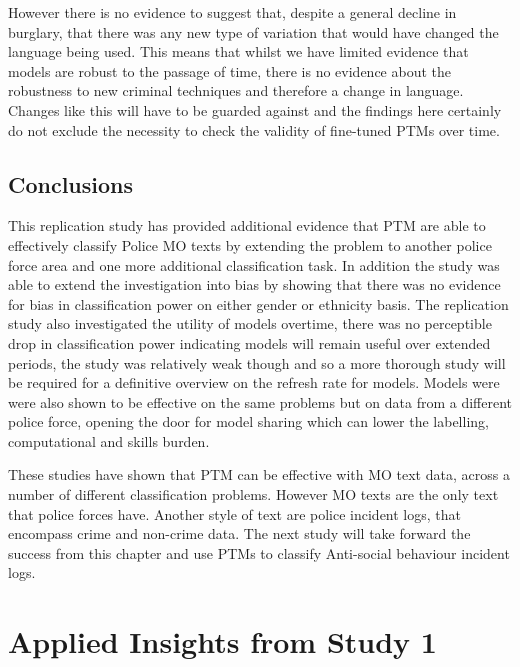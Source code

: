 However there is no evidence to suggest that, despite a general decline in burglary, that there was any new type of variation that would have changed the language being used. This means that whilst we have limited evidence that models are robust to the passage of time, there is no evidence about the robustness to new criminal techniques and therefore a change in language. Changes like this will have to be guarded against and the findings here certainly do not exclude the necessity to check the validity of fine-tuned PTMs over time.


\section{Conclusions}This replication study has provided additional evidence that PTM are able to effectively classify Police MO texts by extending the problem to another police force area and one more additional classification task. In addition the study was able to extend the investigation into bias by showing that there was no evidence for bias in classification power on either gender or ethnicity basis. The replication study also investigated the utility of models overtime, there was no perceptible drop in classification power indicating models will remain useful over extended periods, the study was relatively weak though and so a more thorough study will be required for a definitive overview on the refresh rate for models. Models were were also shown to be effective on the same problems but on data from a different police force, opening the door for model sharing which can lower the labelling, computational and skills burden. 

These studies have shown that PTM can be effective with MO text data, across a number of different classification problems. However MO texts are the only text that police forces have. Another style of text are police incident logs, that encompass crime and non-crime data. The next study will take forward the success from this chapter and use PTMs to classify Anti-social behaviour incident logs.


\chapter{Applied Insights from Study 1}




